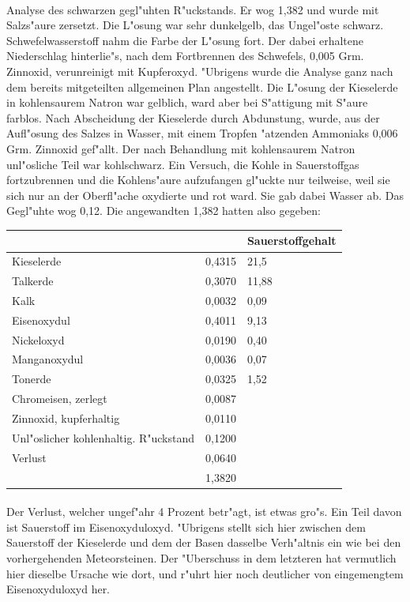 \documentclass[a4paper, 11pt, oneside]{article}
\begin{document}
\paragraph{}
Analyse des schwarzen gegl"uhten R"uckstands. Er wog 1,382 und wurde mit Salzs"aure zersetzt. Die L"osung war sehr dunkelgelb, das Ungel"oste schwarz. Schwefelwasserstoff nahm die Farbe der L"osung fort. Der dabei erhaltene Niederschlag hinterlie"s, nach dem Fortbrennen des Schwefels, 0,005 Grm. Zinnoxid, verunreinigt mit Kupferoxyd. "Ubrigens wurde die Analyse ganz nach dem bereits mitgeteilten allgemeinen Plan angestellt. Die L"osung der Kieselerde in kohlensaurem Natron war gelblich, ward aber bei S"attigung mit S"aure farblos. Nach Abscheidung der Kieselerde durch Abdunstung, wurde, aus der Aufl"osung des Salzes in Wasser, mit einem Tropfen "atzenden Ammoniaks 0,006 Grm. Zinnoxid gef"allt. Der nach Behandlung mit kohlensaurem Natron unl"osliche Teil war kohlschwarz. Ein Versuch, die Kohle in Sauerstoffgas fortzubrennen und die Kohlens"aure aufzufangen gl"uckte nur teilweise, weil sie sich nur an der Oberfl"ache oxydierte und rot ward. Sie gab dabei Wasser ab. Das Gegl"uhte wog 0,12. Die angewandten 1,382 hatten also gegeben:
\begin{center}
\begin{tabular}{ |p{35mm}|p{20mm}|p{24mm}| }
    \hline
     &  & Sauerstoffgehalt\\\hline
    Kieselerde & 0,4315 & 21,5\\\hline
    Talkerde & 0,3070 & 11,88\\\hline
    Kalk & 0,0032 & 0,09\\\hline
    Eisenoxydul & 0,4011 & 9,13\\\hline
    Nickeloxyd & 0,0190 & 0,40\\\hline
    Manganoxydul & 0,0036 & 0,07\\\hline
    Tonerde & 0,0325 & 1,52\\\hline
    Chromeisen, zerlegt & 0,0087 & \\\hline
    Zinnoxid, kupferhaltig & 0,0110 & \\\hline
    Unl"oslicher kohlenhaltig. R"uckstand & 0,1200 & \\\hline
    Verlust & 0,0640 & \\\hline
     & 1,3820 & \\
    \hline
\end{tabular}
\end{center}
\paragraph{}
Der Verlust, welcher ungef"ahr 4 Prozent betr"agt, ist etwas gro"s. Ein Teil davon ist Sauerstoff im Eisenoxyduloxyd. "Ubrigens stellt sich hier zwischen dem Sauerstoff der Kieselerde und dem der Basen dasselbe Verh"altnis ein wie bei den vorhergehenden Meteorsteinen. Der "Uberschuss in dem letzteren hat vermutlich hier dieselbe Ursache wie dort, und r"uhrt hier noch deutlicher von eingemengtem Eisenoxyduloxyd her.
\end{document}
